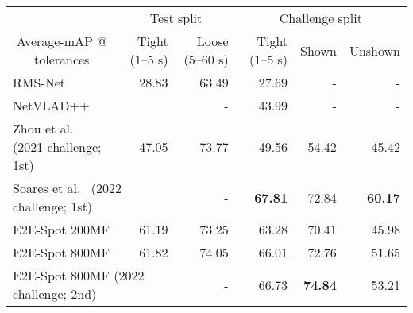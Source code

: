 \documentclass[runningheads]{llncs}
\newcommand{\OURMETHOD}{{E2E-Spot}\xspace}
\newcommand{\textsuperddagger}{\textsuperscript{\textdaggerdbl}}
\newcommand{\sota}[1]{\textbf{#1}}
\begin{document}
\renewcommand{\tabcolsep}{0.055cm}
\begin{table*}[t]
    \caption{{\bf Average-mAP @ $t$ for tolerances in seconds.}
    SOTA in \sota{bold}.
We show the top results from the CVPR 2021 and 2022 SoccerNet Action Spotting challenges.
\textdaggerdbl~indicates challenge results --- trained on the train, validation, and test splits.
Shown and unshown refer to whether actions are visible;~\OURMETHOD is better at detecting the former, but Soares et al.~\cite{densedetectionanchorsrevisited} is superior at the latter.
    }
    \label{tab:soccernet_results}
    {
    \scriptsize
    \centering
    \begin{tabularx}{\textwidth}{lrrr|rr}
        \toprule
        & \multicolumn{2}{c}{Test split}
        & \multicolumn{3}{c}{Challenge split} \\
        \multicolumn{1}{c}{Average-mAP @ tolerances}
            & Tight (1--5 s)
            & Loose (5--60 s)
            & Tight (1--5 s)
            & Shown
            & Unshown \\
        \midrule
        RMS-Net~\cite{rmsnet}
            & 28.83
            & 63.49
            & 27.69
            & -
            & - \\
        \multicolumn{2}{l}{NetVLAD++~\cite{netvladpp}}
            - & - & 43.99 & - & - \\
        Zhou et al.~\cite{featurecombattention} (2021 challenge; 1st)
            & 47.05
            & 73.77
            & 49.56
            & 54.42
            & 45.42 \\
        \multicolumn{2}{l}{\textsuperddagger Soares et al.~\cite{densedetectionanchorsrevisited} (2022 challenge; 1st)}
            -
            & -
            & \textsuperddagger\sota{67.81}
            & \textsuperddagger72.84
            & \textsuperddagger\sota{60.17} \\
        \midrule
        \multicolumn{1}{l}{\OURMETHOD 200MF}
            & 61.19 & 73.25 & 63.28 & 70.41 & 45.98 \\
        \multicolumn{1}{l}{\OURMETHOD 800MF}
            & 61.82 & 74.05 & 66.01 & 72.76 & 51.65 \\
        \multicolumn{2}{l}{\textsuperddagger\OURMETHOD 800MF (2022 challenge; 2nd)}
            - & - & \textsuperddagger 66.73 & \textsuperddagger \sota{74.84} & \textsuperddagger 53.21 \\
        \bottomrule
    \end{tabularx}
    }
\end{table*}
 
\end{document}
